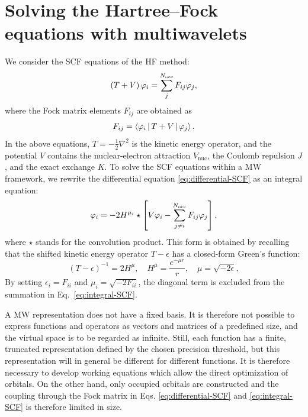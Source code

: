 \documentclass[journal=jctcce, manuscript=article]{achemso}
\begin{document}
\section{Solving the Hartree--Fock equations with multiwavelets}

We consider the \ac{SCF} equations of the \ac{HF} method:
\begin{equation}\label{eq:differential-SCF}
  \left(T + V \right) \varphi_i = \sum_{j}^{N_{\mathrm{occ}}} F_{ij} \varphi_j,
\end{equation}
where the Fock matrix elements $F_{ij}$ are obtained as
\begin{equation}\label{eq:fock-matrix-definition}
  F_{ij} = \Braket{ {\varphi_i}|{T+V}|{\varphi_j}}.
\end{equation}
In the above equations, $T = -\frac{1}{2}\nabla^2$ is the kinetic
energy operator, and the potential $V$ contains the nuclear-electron
attraction $V_{\mathrm{nuc}}$, the Coulomb repulsion $J$, and the exact exchange $K$. 
To solve the \ac{SCF} equations within a \ac{MW} framework, we rewrite the differential equation \eqref{eq:differential-SCF} as an integral equation:
\begin{equation}\label{eq:integral-SCF}
\varphi_i = -2 H^{\mu_i}\star\left[V\varphi_i - \sum_{j \ne i}^{N_{\mathrm{occ}}} F_{ij} \varphi_j\right],
\end{equation}
where $\star$ stands for the convolution product.
This form is obtained by recalling that the shifted kinetic energy operator $T-\epsilon$ has a closed-form Green's function:\cite{Kalos1962-ok,Beylkin2005-kg}
\begin{equation}\label{eq:helmholtz-green}
    (T-\epsilon)^{-1} = 2 H^{\mu}, \quad H^{\mu} = \frac{e^{-\mu r}}{r}, \quad \mu = \sqrt{-2\epsilon},
\end{equation}
By setting $\epsilon_i = F_{ii}$ and $\mu_i = \sqrt{-2F_{ii}}$, the diagonal term is excluded from the summation in Eq.~\eqref{eq:integral-SCF}.

A \ac{MW} representation does not have a fixed basis. It is therefore not possible to express functions and operators as vectors and matrices of a predefined size, and the virtual space is to be regarded as infinite. Still, each function has a finite, truncated representation defined by the chosen precision threshold, but this representation will in general be different for different functions. It is therefore necessary to develop working equations which allow the direct optimization of orbitals. On the other hand, only occupied orbitals are constructed and the coupling through the Fock matrix in Eqs. \eqref{eq:differential-SCF} and \eqref{eq:integral-SCF} is therefore limited in size.
\end{document}
